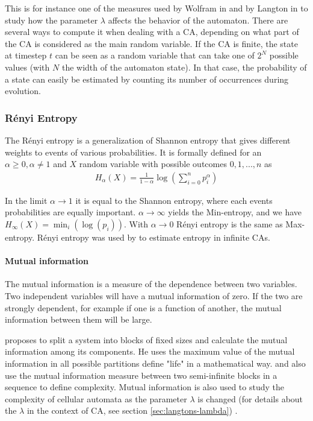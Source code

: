 This is for instance one of the measures used by Wolfram in
\parencite{wolframStatisticalMechanicsCellular1983} and by Langton in
\parencite{langtonComputationEdgeChaos1990} to study how the parameter $\lambda$
affects the behavior of the automaton. There are several ways to compute it when
dealing with a CA, depending on what part of the CA is considered as the main
random variable. If the CA is finite, the state at timestep $t$ can be seen as a
random variable that can take one of $2^N$ possible values (with $N$ the width
of the automaton state). In that case, the probability of a state can easily be
estimated by counting its number of occurrences during evolution.

\subsubsection{Rényi Entropy}
The Rényi entropy is a generalization of Shannon entropy that gives different
weights to events of various probabilities. It is formally defined for an
$\alpha \geq 0, \alpha \neq 1$ and $X$ random variable with possible outcomes
$0, 1, ..., n$ as
\begin{align*}
  H_\alpha(X) = \frac{1}{1-\alpha} \log\left(\sum_{i=0}^np_i^\alpha\right)
\end{align*}

In the limit $\alpha \rightarrow 1$ it is equal to the Shannon entropy, where
each events probabilities are equally important. $\alpha \rightarrow \infty$
yields the Min-entropy, and we have $H_{\infty} (X) = \min_{i}(\log(p_{i}))$.
With $\alpha \rightarrow 0$ Rényi entropy is the same as Max-entropy. Rényi
entropy was used by \textcite{wolframStatisticalMechanicsCellular1983} to
estimate entropy in infinite CAs.

\paragraph{Mutual information}
The mutual information is a measure of the dependence between two variables. Two
independent variables will have a mutual information of zero. If the two are
strongly dependent, for example if one is a function of another, the mutual
information between them will be large.

\textcite{chaitinMathematicalDefinitionLife1987} proposes to split a system into
blocks of fixed sizes and calculate the mutual information among its components.
He uses the maximum value of the mutual information in all possible partitions
define "life" in a mathematical way. \textcite{shawDrippingFaucetModel1984} and
\textcite{grassbergerQuantitativeTheorySelfgenerated1986} also use the mutual
information measure between two semi-infinite blocks in a sequence to define
complexity. Mutual information is also used to study the complexity of cellular
automata as the parameter $\lambda$ is changed (for details about the $\lambda$
in the context of \ac{CA}, see section \ref{sec:langtons-lambda})
\parencite{gutowitzMethodsDesigningCellular1988,
  liTransitionPhenomenaCellular1990}.


